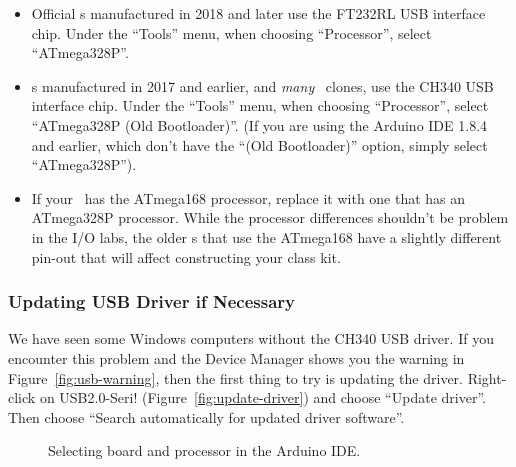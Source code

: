 \begin{itemize}
\item Official \nano{}s manufactured in 2018 and later use the FT232RL USB
    interface chip. Under the ``Tools'' menu, when choosing ``Processor'',
    select ``ATmega328P''.
\item \nano{}s manufactured in 2017 and earlier, and \textit{many} \nano\
    clones, use the CH340 USB interface chip. Under the ``Tools'' menu, when
    choosing ``Processor'', select ``ATmega328P (Old Bootloader)''. (If you are
    using the Arduino IDE 1.8.4 and earlier, which don't have the ``(Old
    Bootloader)'' option, simply select ``ATmega328P'').
\item If your \nano\ has the ATmega168 processor, replace it with one that has
    an ATmega328P processor. While the processor differences shouldn't be
    problem in the I/O labs, the older \nano{}s that use the ATmega168 have a
    slightly different pin-out that will affect constructing your class kit.
\end{itemize}

\subsubsection{Updating USB Driver if Necessary}

We have seen some Windows computers without the CH340 USB driver. If you
encounter this problem and the Device Manager shows you the warning in
Figure~\ref{fig:usb-warning}, then the first thing to try is updating the
driver. Right-click on USB2.0-Seri! (Figure~\ref{fig:update-driver}) and choose
``Update driver''. Then choose ``Search automatically for updated driver
software''.

\begin{figure}
    \centering
    \hfil

    \caption{Selecting board and processor in the Arduino IDE.}
\end{figure}

